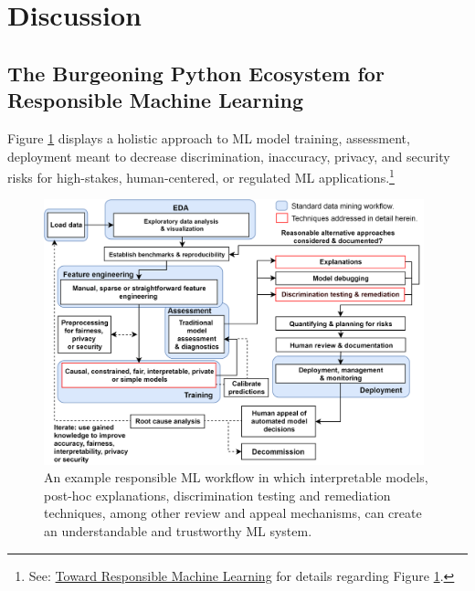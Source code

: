 \documentclass[information,article,submit,moreauthors,pdftex]{definitions/mdpi}
\begin{document}
\section{Discussion}\label{sec:disc}

\subsection{The Burgeoning Python Ecosystem for Responsible Machine Learning}

Figure \ref{fig:blueprint} displays a holistic approach to ML model training, assessment, deployment meant to decrease discrimination, inaccuracy, privacy, and security risks for high-stakes, human-centered, or regulated ML applications.\footnote{See: \href{https://github.com/jphall663/hc_ml}{Toward Responsible Machine Learning} for details regarding Figure \ref{fig:blueprint}.}      

\begin{figure}[H]
	\centering
	\includegraphics[width=11cm]{img/blueprint.png}
	\caption{An example responsible ML workflow in which interpretable models, post-hoc explanations, discrimination testing and remediation techniques, among other review and appeal mechanisms, can create an understandable and trustworthy ML system.}
	\label{fig:blueprint}
\end{figure} 
\end{document}
